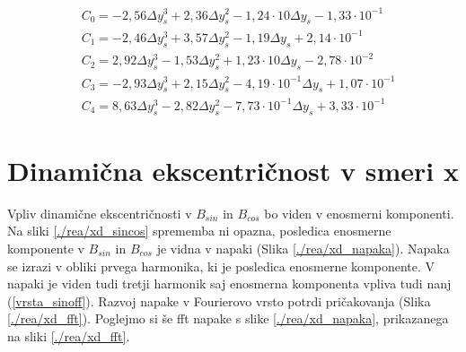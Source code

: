 \begin{eqnarray}
&C_0 =-2,56\Delta y_s^{3}+2,36\Delta y_s^{2}-1,24\cdot 10\Delta y_s-1,33\cdot 10^{-1} \\     
&C_1 =-2,46\Delta y_s^{3}+3,57\Delta y_s^{2}-1,19\Delta y_s+2,14\cdot 10^{-1} \\             
&C_2 =2,92\Delta y_s^{3}-1,53\Delta y_s^{2}+1,23\cdot 10\Delta y_s-2,78\cdot 10^{-2} \\      
&C_3 =-2,93\Delta y_s^{3}+2,15\Delta y_s^{2}-4,19\cdot 10^{-1}\Delta y_s+1,07\cdot 10^{-1} \\
&C_4 =8,63\Delta y_s^{3}-2,82\Delta y_s^{2}-7,73\cdot 10^{-1}\Delta y_s+3,33\cdot 10^{-1}          
\end{eqnarray}
\section{Dinamična ekscentričnost v smeri x}
Vpliv dinamične ekscentričnosti v $B_{sin}$ in $B_{cos}$ bo viden v enosmerni komponenti. Na sliki  \ref{./rea/xd_sincos} sprememba ni opazna, posledica enosmerne komponente v $B_{sin}$ in $B_{cos}$  je vidna v napaki (Slika \ref{./rea/xd_napaka}). Napaka se izrazi v obliki prvega harmonika, ki je posledica enosmerne komponente. V napaki je viden tudi tretji harmonik saj enosmerna komponenta vpliva tudi nanj (\ref{vrsta_sinoff}). Razvoj napake v Fourierovo vrsto potrdi pričakovanja (Slika \ref{./rea/xd_fft}). Poglejmo si še fft napake s slike \ref{./rea/xd_napaka}, prikazanega na sliki \ref{./rea/xd_fft}.
\newpage
